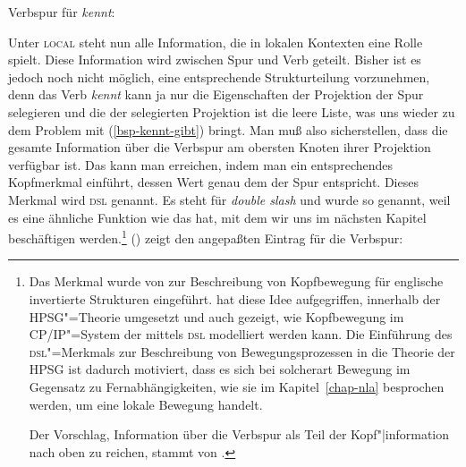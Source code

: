 \ea
\label{le-verbspur-kennt-ohne-dsl}
Verbspur für \emph{kennt}:\\\samepage
{}
\z

\noindent
Unter \textsc{local} steht nun alle Information, die in lokalen Kontexten eine Rolle spielt.
Diese Information wird zwischen Spur und Verb geteilt. Bisher ist es jedoch noch nicht möglich,
eine entsprechende Strukturteilung vorzunehmen, denn das Verb \emph{kennt} kann ja nur
die Eigenschaften der Projektion der Spur selegieren und die \compsl der selegierten
Projektion ist die leere Liste, was uns wieder zu dem Problem mit (\ref{bsp-kennt-gibt}) bringt. Man
muß also sicherstellen, dass die gesamte Information über die Verbspur am obersten Knoten
ihrer Projektion verfügbar ist. Das kann man erreichen, indem man ein entsprechendes Kopfmerkmal
einführt, dessen Wert genau dem \localw der Spur entspricht. Dieses Merkmal wird \textsc{dsl}
genannt. Es steht für \emph{double slash} und wurde so genannt, weil es eine ähnliche
Funktion wie das \slashm hat, mit dem wir uns im nächsten Kapitel beschäftigen werden.\footnote{
  Das Merkmal \dsl wurde von \citet*{Jacobson87} zur Beschreibung von Kopfbewegung 
  für englische invertierte Strukturen eingeführt. \citet{Borsley89}
  hat diese Idee aufgegriffen, innerhalb der HPSG"=Theorie umgesetzt und 
  auch gezeigt, wie Kopfbewegung im CP/IP"=System der \gbt mittels \textsc{dsl} modelliert werden
  kann.
  Die Einführung des \textsc{dsl}"=Merkmals zur Beschreibung von Bewegungsprozessen
  in die Theorie der HPSG ist dadurch motiviert, dass es sich bei solcherart Bewegung
  im Gegensatz zu Fernabhängigkeiten, wie sie im Kapitel~\ref{chap-nla}
  besprochen werden, um eine lokale Bewegung handelt.

  Der Vorschlag, Information über die Verbspur als Teil der Kopf"|information nach oben zu reichen,
  stammt von \citet{Oliva92a}.%
}
() zeigt den angepaßten Eintrag für die Verbspur:

